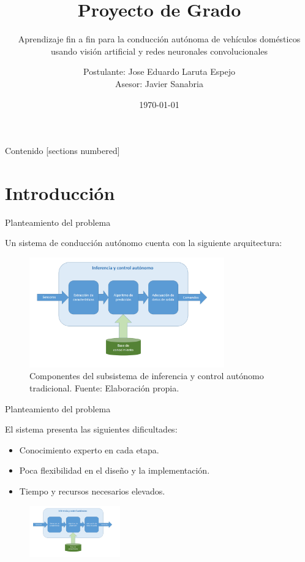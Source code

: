 \documentclass[10pt]{beamer}
\title{Proyecto de Grado}
\subtitle{Aprendizaje fin a fin para la conducción autónoma de vehículos domésticos usando visión artificial y redes neuronales convolucionales}
\date{\today}
\author{Postulante: Jose Eduardo Laruta Espejo \\ 
        Asesor: Javier Sanabria}
\institute{Universidad Mayor de San Andrés - Facultad de Ingeniería}
\begin{document}
\maketitle

\begin{frame}{Contenido}
  [sections numbered]
  \tableofcontents[hideallsubsections]
\end{frame}

\section{Introducción}


\begin{frame}[fragile]{Planteamiento del problema}

  Un sistema de conducción autónomo cuenta con la siguiente arquitectura:
  \begin{figure}[!h] 
    \centering
    \includegraphics[width=0.75\textwidth]{../img/inferencia}
    \caption[Inferencia y control autónomo tradicional]{Componentes del subsistema de inferencia y control autónomo tradicional. Fuente: Elaboración propia.}
\end{figure}

\end{frame}

\begin{frame}[fragile]{Planteamiento del problema}

    El sistema presenta las siguientes dificultades:
    \begin{itemize}
        \item Conocimiento experto en cada etapa.
        \item Poca flexibilidad en el diseño y la implementación.
        \item Tiempo y recursos necesarios elevados.
    \end{itemize}
    \begin{figure}[!h] 
      \centering
      \includegraphics[width=0.35\textwidth]{../img/inferencia}
      \end{figure}
  
  \end{frame}
\end{document}
